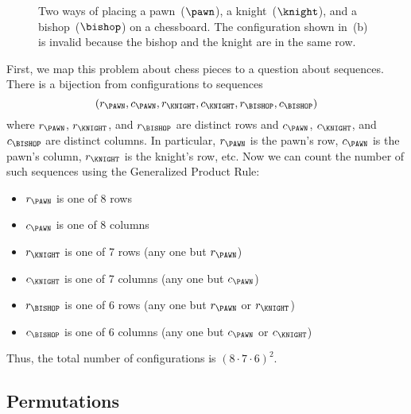\begin{figure}\normalbaselines

\subfloat[valid]{\chessboard[setpieces={bb4, ne7, pf2}]}
\subfloat[invalid]{\chessboard[setpieces={bc3, pe6, nf3}]}

\caption{Two ways of placing a pawn~($\pawn$), a knight~($\knight$),
  and a bishop~($\bishop$) on a chessboard.  The configuration shown
  in~(b) is invalid because the bishop and the knight are in the same
  row.}

\label{fig:11Q7}

\end{figure}

First, we map this problem about chess pieces to a question about
sequences.  There is a bijection from configurations to sequences
%
\[
    (r_{\PAWN}, c_{\PAWN}, r_{\KNIGHT}, c_{\KNIGHT}, r_{\BISHOP}, c_{\BISHOP})
\]
%
where $r_{\PAWN}$, $r_{\KNIGHT}$, and $r_{\BISHOP}$ are distinct rows
and $c_{\PAWN}$, $c_{\KNIGHT}$, and $c_{\BISHOP}$ are distinct
columns.  In particular, $r_{\PAWN}$ is the pawn's row, $c_{\PAWN}$ is
the pawn's column, $r_{\KNIGHT}$ is the knight's row, etc.  Now we can
count the number of such sequences using the Generalized Product Rule:
\begin{itemize}\compactlist

\item $r_{\PAWN}$ is one of 8 rows

\item $c_{\PAWN}$ is one of 8 columns

\item $r_{\KNIGHT}$ is one of 7 rows (any one but $r_{\PAWN}$)

\item $c_{\KNIGHT}$ is one of 7 columns (any one but $c_{\PAWN}$)

\item $r_{\BISHOP}$ is one of 6 rows (any one but $r_{\PAWN}$ or
  $r_{\KNIGHT}$)

\item $c_{\BISHOP}$ is one of 6 columns (any one but $c_{\PAWN}$ or
  $c_{\KNIGHT}$)

\end{itemize}
Thus, the total number of configurations is $(8 \cdot 7 \cdot 6)^2$.

\subsection{Permutations}\label{sec:permutations}


